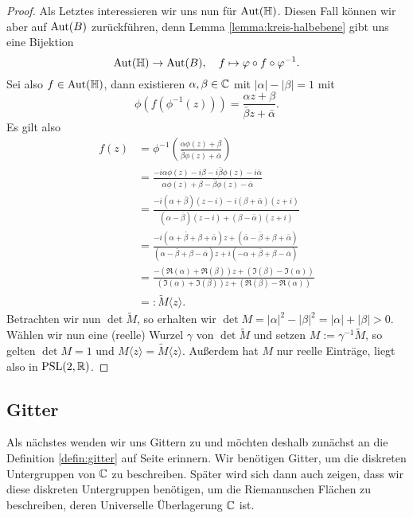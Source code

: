 \begin{proof}
  Als Letztes interessieren wir uns nun für $\operatorname{Aut}(\mathbb{H})$. Diesen Fall
  können wir aber auf \break$\operatorname{Aut}(B)$ zurückführen, denn Lemma
  \ref{lemma:kreis-halbebene} gibt uns eine Bijektion
  \[
  \operatorname{Aut}(\mathbb{H}) \rightarrow \operatorname{Aut}(B), \quad f \mapsto \varphi \circ f \circ \varphi^{-1}.
  \]
  Sei also $f \in \operatorname{Aut}(\mathbb{H})$, dann existieren $\alpha, \beta \in \mathbb{C}$
  mit $|\alpha| - |\beta| = 1$ mit
  \[
  \phi( f( \phi^{-1}(z))) = \frac{\alpha z + \beta}{\bar \beta z +
    \bar \alpha}.
  \]
  Es gilt also
  \begin{align*}
    f(z) & = \phi^{-1} \left ( \frac{\alpha \phi(z) + \beta}{\bar
        \beta \phi(z) + \bar \alpha} \right ) \\
    & = \frac{-i \alpha \phi(z) - i \beta - i \bar \beta \phi(z) - i
      \bar \alpha}{\alpha \phi(z) + \beta - \bar \beta \phi(z) - \bar
      \alpha} \\
    & = \frac{-i (\alpha + \bar \beta)(z-i) -i (\beta + \bar
      \alpha)(z+i)}{(\alpha - \bar \beta)(z -i) + (\beta - \bar
      \alpha)(z+i)} \\
    & = \frac{-i ( \alpha + \bar \beta + \beta + \bar \alpha) z + (
      \bar \alpha - \bar \beta + \beta + \bar \alpha)}{(\alpha - \bar
      \beta + \beta - \bar \alpha)z + i (- \alpha + \bar \beta + \beta
      - \bar \alpha)} \\
    & = \frac{ - ( \Re(\alpha) + \Re(\beta)) z +  (\Im(\beta) -
      \Im(\alpha))}{(\Im(\alpha) + \Im(\beta))z + ( \Re(\beta) -
      \Re(\alpha))} \\
    & =: \tilde M\langle z \rangle.
  \end{align*}
  Betrachten wir nun $\det \tilde M$, so erhalten wir $\det M = |\alpha|^2 -
  |\beta|^2 = |\alpha| + |\beta| > 0$. Wählen wir nun eine (reelle)
  Wurzel $\gamma$ von $\det \tilde M$ und setzen $M := \gamma^{-1}
  \tilde M$, so gelten $\det M = 1$ und $M \langle z \rangle = \tilde M
  \langle z \rangle$. Außerdem hat $M$ nur reelle Einträge, liegt also
  in $\operatorname{PSL}(2, \mathbb{R})$.
\end{proof}

\subsection{Gitter}
\label{sec:gitter}

Als nächstes wenden wir uns Gittern zu und möchten deshalb zunächst an
die Definition \ref{defin:gitter} auf Seite \pageref{defin:gitter}
erinnern. Wir benötigen Gitter, um die
diskreten Untergruppen von $\mathbb{C}$ zu beschreiben. Später wird sich dann
auch zeigen, dass wir diese diskreten Untergruppen benötigen, um die
Riemannschen Flächen zu beschreiben, deren Universelle Überlagerung
$\mathbb{C}$ ist.


